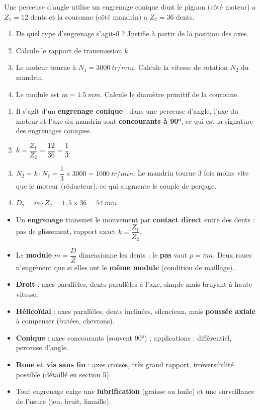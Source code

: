 \documentclass[11pt]{article}
\begin{document}
\begin{exercice}
Une perceuse d'angle utilise un engrenage conique dont le pignon (côté moteur) a $Z_1 = 12$ dents et la couronne (côté mandrin) a $Z_2 = 36$ dents.
\begin{enumerate}
\item De quel type d'engrenage s'agit-il ? Justifie à partir de la position des axes.
\item Calcule le rapport de transmission $k$.
\item Le moteur tourne à $N_1 = \SI{3000}{tr/min}$. Calcule la vitesse de rotation $N_2$ du mandrin.
\item Le module est $m = \SI{1,5}{mm}$. Calcule le diamètre primitif de la couronne.
\end{enumerate}
\end{exercice}

\begin{corrige}
\begin{enumerate}
\item Il s'agit d'un \textbf{engrenage conique} : dans une perceuse d'angle, l'axe du moteur et l'axe du mandrin sont \textbf{concourants à 90°}, ce qui est la signature des engrenages coniques.
\item $k = \dfrac{Z_1}{Z_2} = \dfrac{12}{36} = \dfrac{1}{3}$.
\item $N_2 = k \cdot N_1 = \dfrac{1}{3} \times 3000 = \SI{1000}{tr/min}$. Le mandrin tourne 3 fois moins vite que le moteur (réducteur), ce qui augmente le couple de perçage.
\item $D_2 = m \cdot Z_2 = 1{,}5 \times 36 = \SI{54}{mm}$.
\end{enumerate}
\end{corrige}

\begin{aretenir}
\begin{itemize}
\item Un \textbf{engrenage} transmet le mouvement par \textbf{contact direct} entre des dents : pas de glissement, rapport exact $k = \dfrac{Z_1}{Z_2}$.
\item Le \textbf{module} $m = \dfrac{D}{Z}$ dimensionne les dents ; le \textbf{pas} vaut $p = \pi m$. Deux roues n'engrènent que si elles ont le \textbf{même module} (condition de maillage).
\item \textbf{Droit} : axes parallèles, dents parallèles à l'axe, simple mais bruyant à haute vitesse.
\item \textbf{Hélicoïdal} : axes parallèles, dents inclinées, silencieux, mais \textbf{poussée axiale} à compenser (butées, chevrons).
\item \textbf{Conique} : axes concourants (souvent 90°) ; applications : différentiel, perceuse d'angle.
\item \textbf{Roue et vis sans fin} : axes croisés, très grand rapport, irréversibilité possible (détaillé en section 5).
\item Tout engrenage exige une \textbf{lubrification} (graisse ou huile) et une surveillance de l'usure (jeu, bruit, limaille).
\end{itemize}
\end{aretenir}
\end{document}
